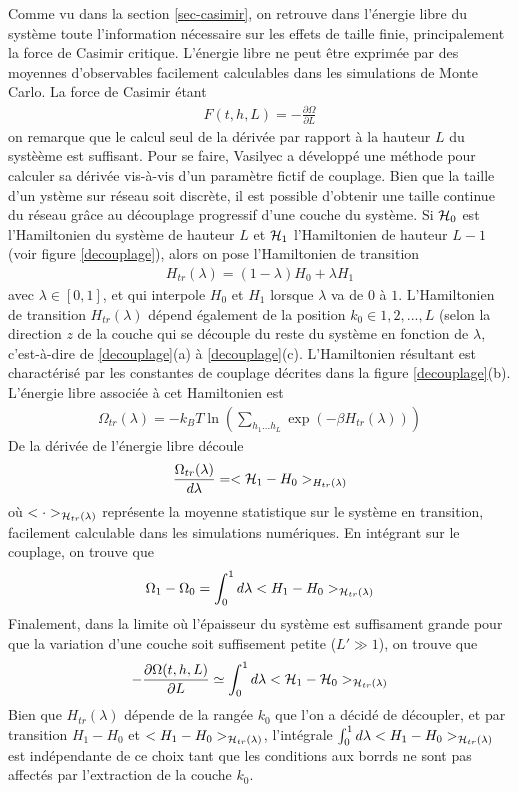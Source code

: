 Comme vu dans la section \ref{sec-casimir}, on retrouve dans l'énergie libre du système toute l'information nécessaire sur les effets de taille finie, principalement la force de Casimir critique. L'énergie libre ne peut être exprimée par des moyennes d'observables facilement calculables dans les simulations de Monte Carlo. La force de Casimir étant 
\begin{align}
    F(t,h,L) = - \frac{\partial \Omega}{\partial L}
\end{align}
on remarque que le calcul seul de la dérivée par rapport à la hauteur $L$ du systèème est suffisant. Pour se faire, Vasilyec \cite{vasilyev_monte_2007} a développé une méthode pour calculer sa dérivée vis-à-vis d'un paramètre fictif de couplage. Bien que la taille d'un ystème sur réseau soit discrète, il est possible d'obtenir une taille continue du réseau grâce au découplage progressif d'une couche du système. 
Si $\mathcal{H}_0$ est l'Hamiltonien du système de hauteur $L$ et $\mathcal{H}_1$ l'Hamiltonien de hauteur $L-1$ (voir figure \ref{decouplage}), alors on pose l'Hamiltonien de transition
\begin{align}
    H_{tr}(\lambda) = (1-\lambda) H_0 + \lambda H_1
    \label{hamil-trans}
\end{align}
avec $\lambda \in [0,1]$, et qui interpole $H_0$ et $H_1$ lorsque $\lambda$ va de $0$ à $1$. 
L'Hamiltonien de transition $H_{tr}(\lambda)$ dépend également de la position $k_0 \in {1,2,...,L}$ (selon la direction $z$ de la couche qui se découple du reste du système en fonction de $\lambda$, c'est-à-dire de \ref{decouplage}(a) à \ref{decouplage}(c). L'Hamiltonien résultant est charactérisé par les constantes de couplage décrites dans la figure \ref{decouplage}(b). L'énergie libre associée à cet Hamiltonien est
\begin{align}
    \Omega_{tr}(\lambda) = -k_B T \ln \left( \sum_{h_1 ... h_L} \exp(-\beta H_{tr}(\lambda)) \right)
\end{align}
De la dérivée de l'énergie libre découle
\begin{align}
    \frac{\Omega_{tr}(\lambda)}{d\lambda} = < \mathcal{H}_1 - H_0>_{H_{tr}(\lambda)}
\end{align}
où $< \cdot >_{\mathcal{H}_{tr}(\lambda)}$ représente la moyenne statistique sur le système en transition, facilement calculable dans les simulations numériques. En intégrant sur le couplage, on trouve que
\begin{align}
    \Omega_1 - \Omega_0 = \int_0^1 d\lambda  < H_1 - H_0>_{\mathcal{H}_{tr}(\lambda)}
\end{align}
Finalement, dans la limite où l'épaisseur du système est suffisament grande pour que la variation d'une couche soit suffisement petite ($L' \gg 1$), on trouve que
\begin{align}
   - \frac{\partial \Omega(t,h,L)}{\partial L} \simeq  \int_0^1 d\lambda  < \mathcal{H}_1 - \mathcal{H}_0>_{\mathcal{H}_{tr}(\lambda)}
\end{align}
Bien que $H_{tr}(\lambda)$ dépende de la rangée $k_0$ que l'on a décidé de découpler, et par transition $H_1-H_0$ et $< H_1 - H_0>_{\mathcal{H}_{tr}(\lambda)}$, l'intégrale $\int_0^1 d\lambda < H_1 - H_0>_{\mathcal{H}_{tr}(\lambda)}$ est indépendante de ce choix tant que les conditions aux borrds ne sont pas affectés par l'extraction de la couche $k_0$. 	

